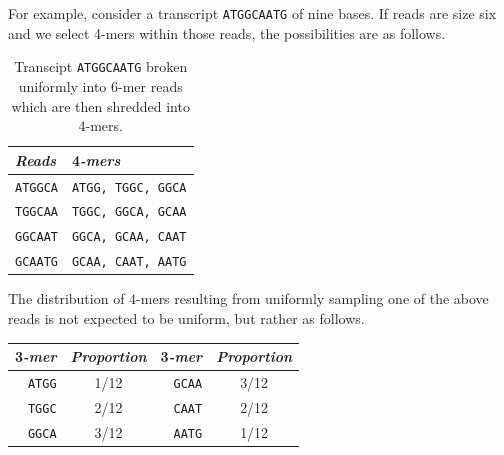 \documentclass[11pt]{article}
\newcommand{\rob}[1]{\todo[inline]{\textbf{Robert: }#1}}
\begin{document}
For example, consider a transcript \texttt{ATGGCAATG} of nine bases.
If reads are size six and we select 4-mers within those reads,
the possibilities are as follows.
\begin{table}[h!]
\centering
  \begin{tabular}{l|l}
    \textit{Reads} & 4\textit{-mers}
    \\ \hline \hline
    \texttt{ATGGCA} & \texttt{ATGG, TGGC, GGCA}
    \\ \hline
    \texttt{\hspace{0.5em}TGGCAA} & \texttt{\hspace{3em}TGGC, GGCA, GCAA}
    \\ \hline
    \texttt{\hspace{1em}GGCAAT} & \texttt{\hspace{6em}GGCA, GCAA, CAAT}
    \\ \hline
    \texttt{\hspace{1.5em}GCAATG} & \texttt{\hspace{9em}GCAA, CAAT, AATG}
  \end{tabular}
  \caption{Transcipt \texttt{ATGGCAATG} broken uniformly into $6$-mer reads which are then shredded into $4$-mers.}
  \label{tab:reads}
\end{table}
The distribution of $4$-mers resulting from uniformly sampling one of the above reads
is not expected to be uniform, but rather as follows.
\begin{center}
  \begin{tabular}{r|c||r|c}
    3\textit{-mer} & \textit{Proportion} & 3\textit{-mer} & \textit{Proportion}
    \\ \hline \hline
    \texttt{ATGG} & 1/12 & \texttt{GCAA} & 3/12
    \\ \hline
    \texttt{TGGC} & 2/12 & \texttt{CAAT} & 2/12
    \\ \hline
    \texttt{GGCA} & 3/12 & \texttt{AATG} & 1/12
  \end{tabular}
\end{center}
\end{document}
